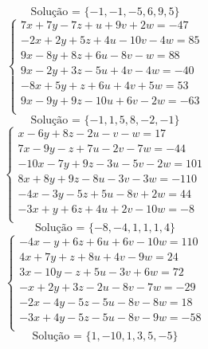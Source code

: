 \documentclass[12pt,oneside,a4paper]{article}
\begin{document}
\begin{equation*}
\text{Solução = }\{-1,-1,-5,6,9,5\}
\end{equation*}
\vspace{\baselineskip}
\begin{equation*}
\begin{cases}
7x+7y-7z+u+9v+2w=-47 \\
-2x+2y+5z+4u-10v-4w=85 \\
9x-8y+8z+6u-8v-w=88 \\
9x-2y+3z-5u+4v-4w=-40 \\
-8x+5y+z+6u+4v+5w=53 \\
9x-9y+9z-10u+6v-2w=-63 \\
\end{cases}
\end{equation*}
\begin{equation*}
\text{Solução = }\{-1,1,5,8,-2,-1\}
\end{equation*}
\vspace{\baselineskip}
\begin{equation*}
\begin{cases}
x-6y+8z-2u-v-w=17 \\
7x-9y-z+7u-2v-7w=-44 \\
-10x-7y+9z-3u-5v-2w=101 \\
8x+8y+9z-8u-3v-3w=-110 \\
-4x-3y-5z+5u-8v+2w=44 \\
-3x+y+6z+4u+2v-10w=-8 \\
\end{cases}
\end{equation*}
\begin{equation*}
\text{Solução = }\{-8,-4,1,1,1,4\}
\end{equation*}
\vspace{\baselineskip}
\begin{equation*}
\begin{cases}
-4x-y+6z+6u+6v-10w=110 \\
4x+7y+z+8u+4v-9w=24 \\
3x-10y-z+5u-3v+6w=72 \\
-x+2y+3z-2u-8v-7w=-29 \\
-2x-4y-5z-5u-8v-8w=18 \\
-3x+4y-5z-5u-8v-9w=-58 \\
\end{cases}
\end{equation*}
\begin{equation*}
\text{Solução = }\{1,-10,1,3,5,-5\}
\end{equation*}
\end{document}
